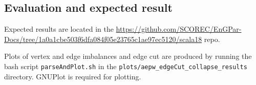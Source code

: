 \subsection{Evaluation and expected result}

Expected results are located in the 
\url{https://github.com/SCOREC/EnGPar-Docs/tree/1a0a1cbe503f6dfa084f05e23765c1ae97ec5120/scala18}
repo.

Plots of vertex and edge imbalances and edge cut are produced by
running the bash script \texttt{parseAndPlot.sh} in the
\texttt{plots/aepw\_edgeCut\_collapse\_results} directory.
GNUPlot is required for plotting.

